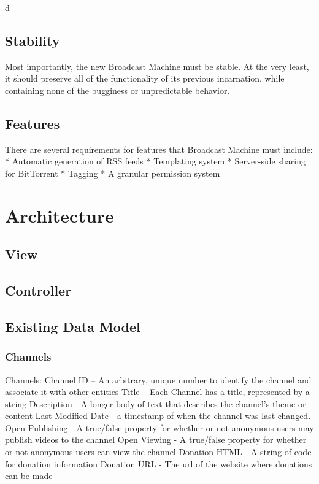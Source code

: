 d\documentclass[a4paper,12pt]{report}
\begin{document}
\section{Stability}

	Most importantly, the new Broadcast Machine must be stable. 
At the very least, it should preserve all of the functionality of its previous incarnation, while containing none of the bugginess or unpredictable behavior. 

\section{Features}
	There are several requirements for features that Broadcast Machine must include:
 * Automatic generation of RSS feeds
 * Templating system
 * Server-side sharing for BitTorrent
 * Tagging
 * A granular permission system

\chapter{Architecture}

\section{View}

\section{Controller}

\section{Existing Data Model}

\subsection{Channels}
Channels:
	Channel ID – An arbitrary, unique number to identify the channel and  associate it with other entities
	Title – Each Channel has a title, represented by a string
	Description - A longer body of text that describes the channel's theme or content
	Last Modified Date - a timestamp of when the channel was last changed.
	Open Publishing - A true/false property for whether or not anonymous users may publish videos to the channel
	Open Viewing - A true/false property for whether or not anonymous users can view the channel
	Donation HTML - A string of code for donation information
	Donation URL - The url of the website where donations can be made 
\end{document}

